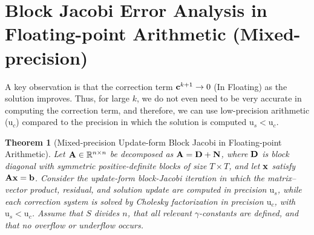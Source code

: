 \documentclass[11pt,draft]{article}
\newcommand{\urd}{\ensuremath{\mathrm{u}}}
\newcommand{\vect}[1]{\mathbf{\MakeLowercase{#1}}}
\newcommand{\mat}[1]{\mathbf{\MakeUppercase{#1}}}
\newcommand{\ireal}[1]{\in\mathbb{R}^{#1}}
\newtheorem{theorem}{Theorem}[section]
\theoremstyle{definition}
\theoremstyle{remark}
\begin{document}
\section{Block Jacobi Error Analysis in Floating-point Arithmetic (Mixed-precision)}
A key observation is that the correction term $\vect{c}^{k+1}\to 0$ (In Floating) as the solution improves.
Thus, for large $k$, we do not even need to be very accurate in computing the correction term, and therefore, we can use low-precision arithmetic ($\urd_c$) compared to the precision in which the solution is computed $\urd_s < \urd_c$.
\begin{theorem}[Mixed-precision Update-form Block Jacobi in Floating-point Arithmetic]\label{theorem:mixed_precision_update_form_block_jacobi_in_floating_point_arithmetic}
Let $\mat{a}\ireal{n\times n}$ be decomposed as
$\mat{a}=\mat{d}+\mat{n}$, where $\mat{d}$ is block diagonal with
symmetric positive-definite blocks of size $T\times T$, and let
$\vect{x}$ satisfy $\mat{a}\vect{x}=\vect{b}$. Consider the update-form
block-Jacobi iteration in which the matrix--vector product, residual, and
solution update are computed in precision $\urd_s$, while each correction
system is solved by Cholesky factorization in precision $\urd_c$, with
$\urd_s<\urd_c$. Assume that $S$ divides $n$, that all relevant
$\gamma$-constants are defined, and that no overflow or underflow occurs.


\end{theorem}
\end{document}
